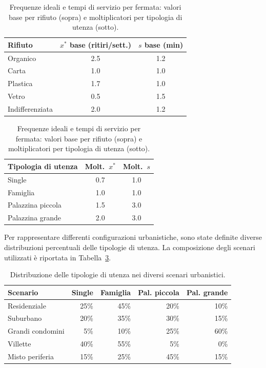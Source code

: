 \begin{table}[htbp]
	\centering
	\caption{Frequenze ideali e tempi di servizio per fermata: valori base per rifiuto (sopra) e moltiplicatori per tipologia di utenza (sotto).}
	\label{tab:xstar_servizio}
	\begin{tabular}{lcc}
		\hline
		Rifiuto & $x^*$ base (ritiri/sett.) & $s$ base (min) \\
		\hline
		Organico        & 2.5 & 1.2 \\
		Carta           & 1.0 & 1.0 \\
		Plastica        & 1.7 & 1.0 \\
		Vetro           & 0.5 & 1.5 \\
		Indifferenziata & 2.0 & 1.2 \\
		\hline
	\end{tabular}
	
	\medskip
	\begin{tabular}{lcc}
		\hline
		Tipologia di utenza & Molt.\ $x^*$ & Molt.\ $s$ \\
		\hline
		Single            & 0.7 & 1.0 \\
		Famiglia          & 1.0 & 1.0 \\
		Palazzina piccola & 1.5 & 3.0 \\
		Palazzina grande  & 2.0 & 3.0 \\
		\hline
	\end{tabular}
\end{table}


Per rappresentare differenti configurazioni urbanistiche, sono state definite diverse distribuzioni percentuali delle tipologie di utenza. La composizione degli scenari utilizzati è riportata in Tabella~\ref{tab:scenari_urbanistici}.

\begin{table}[htbp]
	\centering
	\caption{Distribuzione delle tipologie di utenza nei diversi scenari urbanistici.}
	\label{tab:scenari_urbanistici}
	\begin{tabular}{lrrrr}
		\hline
		Scenario & Single & Famiglia & Pal. piccola & Pal. grande \\
		\hline
		Residenziale & 25\% & 45\% & 20\% & 10\% \\
		Suburbano & 20\% & 35\% & 30\% & 15\% \\
		Grandi condomini & 5\% & 10\% & 25\% & 60\% \\
		Villette & 40\% & 55\% & 5\% & 0\% \\
		Misto periferia & 15\% & 25\% & 45\% & 15\% \\
		\hline
	\end{tabular}
\end{table}


